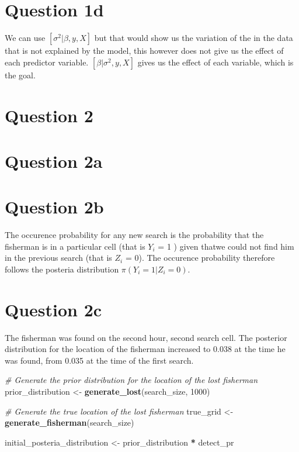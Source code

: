 \documentclass[
]{article}
\newenvironment{Shaded}{\begin{snugshade}}{\end{snugshade}}
\newcommand{\CommentTok}[1]{\textcolor[rgb]{0.56,0.35,0.01}{\textit{#1}}}
\newcommand{\DecValTok}[1]{\textcolor[rgb]{0.00,0.00,0.81}{#1}}
\newcommand{\FunctionTok}[1]{\textcolor[rgb]{0.13,0.29,0.53}{\textbf{#1}}}
\newcommand{\NormalTok}[1]{#1}
\newcommand{\OtherTok}[1]{\textcolor[rgb]{0.56,0.35,0.01}{#1}}
\newcommand{\SpecialCharTok}[1]{\textcolor[rgb]{0.81,0.36,0.00}{\textbf{#1}}}
\begin{document}
\hypertarget{question-1d}{%
\section{Question 1d}\label{question-1d}}

We can use \([\sigma^2|\beta,y,X]\) but that would show us the variation
of the in the data that is not explained by the model, this however does
not give us the effect of each predictor variable.
\([\beta|\sigma^2,y,X]\) gives us the effect of each variable, which is
the goal.

\hypertarget{question-2}{%
\section{Question 2}\label{question-2}}

\hypertarget{question-2a}{%
\section{Question 2a}\label{question-2a}}

\hypertarget{question-2b}{%
\section{Question 2b}\label{question-2b}}

The occurence probability for any new search is the probability that the
fisherman is in a particular cell (that is \(Y_i\) = 1 ) given thatwe
could not find him in the previous search (that is \(Z_i\) = 0). The
occurence probability therefore follows the posteria distribution
\(\pi(Y_i = 1|Z_i = 0)\).

\hypertarget{question-2c}{%
\section{Question 2c}\label{question-2c}}

The fisherman was found on the second hour, second search cell. The
posterior distribution for the location of the fisherman increased to
0.038 at the time he was found, from 0.035 at the time of the first
search.

\begin{Shaded}
\begin{Highlighting}[]
\CommentTok{\# Generate the prior distribution for the location of the lost fisherman}
\NormalTok{prior\_distribution }\OtherTok{\textless{}{-}} \FunctionTok{generate\_lost}\NormalTok{(search\_size, }\DecValTok{1000}\NormalTok{)}

\CommentTok{\# Generate the true location of the lost fisherman}
\NormalTok{true\_grid }\OtherTok{\textless{}{-}} \FunctionTok{generate\_fisherman}\NormalTok{(search\_size)}

\NormalTok{initial\_posteria\_distribution }\OtherTok{\textless{}{-}}\NormalTok{ prior\_distribution }\SpecialCharTok{*}\NormalTok{ detect\_pr}
\end{Highlighting}
\end{Shaded}
\end{document}
